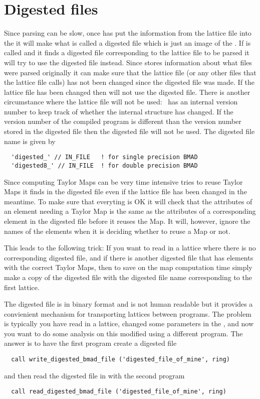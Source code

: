 \section{Digested files}

Since parsing can be slow, once  has put the information
from the lattice file into the  it will make what is
called a digested file which is just an image of the .  If
 is called and it finds a digested file corresponding to
the lattice file to be parsed it will try to use the digested file
instead. Since  stores information about what files were
parsed originally it can make sure that the lattice file (or any other
files that the lattice file calls) has not been changed since the
digested file was made. If the lattice file has been changed then
 will not use the digested file. There is another 
circumstance where the lattice file will not be used: \bmad\ has an
internal version number to keep track of whether the 
internal structure has changed. If the version number of the compiled
program is different than the version number stored in the digested
file then the digested file will not be used. The digested file name
is given by
\begin{verbatim}
  'digested_' // IN_FILE   ! for single precision BMAD 
  'digested8_' // IN_FILE  ! for double precision BMAD 
\end{verbatim}

Since computing Taylor Maps can be very time intensive 
tries to reuse Taylor Maps it finds in the digested file even if the
lattice file has been changed in the meantime. To make sure that
everyting is OK it will check that the attributes of an element
needing a Taylor Map is the same as the attributes of a corresponding
element in the digested file before it reuses the Map. It will,
however, ignore the names of the elements when it is deciding whether
to reuse a Map or not. 

This leads to the following trick: If you want to read in a lattice
where there is no corresponding digested file, and if there is another
digested file that has elements with the correct Taylor Maps, then to
save on the map computation time simply make a copy of the digested
file with the digested file name corresponding to the first lattice.

The digested file is in binary format and is not human readable but it
provides a convienient mechanism for transporting lattices between
programs. The problem is typically you have read in a lattice, changed
some parameters in the , and now you want to do some
analysis on this modified  using a different program. The 
answer is to have the first program create a digested file
\begin{verbatim}
  call write_digested_bmad_file ('digested_file_of_mine', ring)
\end{verbatim}
and then read the digested file in with the second program
\begin{verbatim}
  call read_digested_bmad_file ('digested_file_of_mine', ring)
\end{verbatim}
